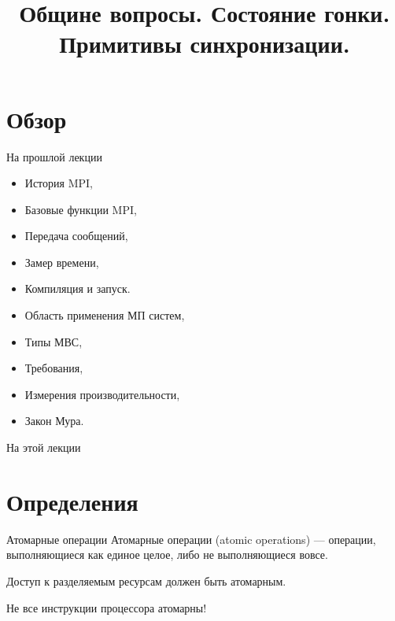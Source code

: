 

\title{Общине вопросы. Состояние гонки. Примитивы синхронизации.}



\begin{frame}
\titlepage
\end{frame}

\section*{Обзор}
\begin{frame}{На прошлой лекции}

\begin{itemize}
\ifmipt
    \item История MPI,
    \item Базовые функции MPI,
    \item Передача сообщений,
    \item Замер времени,
    \item Компиляция и запуск.
\fi
\ifsbertech
    \item Область применения МП систем,
    \item Типы МВС,
    \item Требования,
    \item Измерения производительности,
    \item Закон Мура.
\fi
\end{itemize}
\end{frame}

\begin{frame}{На этой лекции}
\tableofcontents
\end{frame}

\section{Определения}

\begin{frame}{Атомарные операции}
Атомарные операции (\abbr atomic operations) --- операции, выполняющиеся как
единое целое, либо не выполняющиеся вовсе.
\vspace*{0.5cm}

Доступ к разделяемым ресурсам должен быть атомарным.
\vspace*{0.5cm}

Не все инструкции процессора атомарны!
\end{frame}

